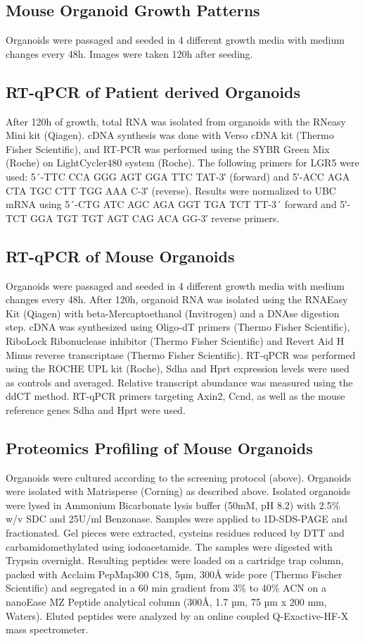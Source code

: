 \begin{flushleft}
\subsection{Mouse Organoid Growth Patterns}
Organoids were passaged and seeded in 4 different growth media with medium changes every 48h. Images were taken 120h after seeding.  

\subsection{RT-qPCR of Patient derived Organoids}
After 120h of growth, total RNA was isolated from organoids with the RNeasy Mini kit (Qiagen). cDNA synthesis was done with Verso cDNA kit (Thermo Fisher Scientific), and RT-PCR was performed using the SYBR Green Mix (Roche) on LightCycler480 system (Roche). The following primers for LGR5 were used: 5´-TTC CCA GGG AGT GGA TTC TAT-3′ (forward) and 5′-ACC AGA CTA TGC CTT TGG AAA C-3′ (reverse). Results were normalized to UBC mRNA using 5´-CTG ATC AGC AGA GGT TGA TCT TT-3´ forward and 5′-TCT GGA TGT TGT AGT CAG ACA GG-3′ reverse primers.

\subsection{RT-qPCR of Mouse Organoids}
Organoids were passaged and seeded in 4 different growth media with medium changes every 48h. After 120h, organoid RNA was isolated using the RNAEasy Kit (Qiagen) with beta-Mercaptoethanol (Invitrogen) and a DNAse digestion step. cDNA was synthesized using Oligo-dT primers (Thermo Fisher Scientific), RiboLock Ribonuclease inhibitor (Thermo Fisher Scientific) and Revert Aid H Minus reverse transcriptase (Thermo Fisher Scientific). RT-qPCR was performed using the ROCHE UPL kit (Roche), Sdha and Hprt expression levels were used as controls and averaged. Relative transcript abundance was measured using the ddCT method. RT-qPCR primers targeting Axin2, Ccnd, as well as the mouse reference genes Sdha and Hprt were used. 

\subsection{Proteomics Profiling of Mouse Organoids}
Organoids were cultured according to the screening protocol (above). Organoids were isolated with Matrisperse (Corning) as described above. Isolated organoids were lysed in Ammonium Bicarbonate lysis buffer (50mM, pH 8.2) with 2.5\% w/v SDC and 25U/ml Benzonase. 
Samples were applied to 1D-SDS-PAGE and fractionated. Gel pieces were extracted, cysteins residues reduced by DTT and carbamidomethylated using iodoacetamide. The samples were digested with Trypsin overnight.
Resulting peptides were loaded on a cartridge trap column, packed with Acclaim PepMap300 C18, 5µm, 300Å wide pore (Thermo Fischer Scientific) and segregated in a 60 min gradient from 3\% to 40\% ACN on a nanoEase MZ Peptide analytical column (300Å, 1.7 µm, 75 µm x 200 mm, Waters). Eluted peptides were analyzed by an online coupled Q-Exactive-HF-X mass spectrometer.


\end{flushleft}
